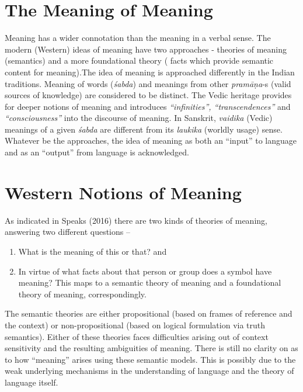 \section*{The Meaning of Meaning}

Meaning has a wider connotation than the meaning in a verbal sense. The modern (Western) ideas of meaning have two approaches - theories of meaning (semantics) and a more foundational theory ( facts which provide semantic content for meaning).The idea of meaning is approached differently in the Indian traditions. Meaning of words (\textit{śabda}) and meanings from other \textit{pramāṇa}-s (valid sources of knowledge) are considered to be distinct. The Vedic heritage provides for deeper notions of meaning and introduces \textit{“infinities”, “transcendences”} and \textit{“consciousness”} into the discourse of meaning. In Sanskrit, \textit{vaidika} (Vedic) meanings of a given \textit{śabda} are different from its \textit{laukika} (worldly usage) sense. Whatever be the approaches, the idea of meaning as both an “input” to language and as an “output” from language is acknowledged.

\newpage


\section*{Western Notions of Meaning}

\vskip -5pt

As indicated in Speaks (2016) there are two kinds of theories of meaning, answering two different questions –

\begin{enumerate}
\itemsep=0pt
\item What is the meaning of this or that? and

 \item In virtue of what facts about that person or group does a symbol have meaning? This maps to a semantic theory of meaning and a foundational theory of meaning, correspondingly.

\end{enumerate}

The semantic theories are either propositional (based on frames of reference and the context) or non-propositional (based on logical formulation via truth semantics). Either of these theories faces difficulties arising out of context sensitivity and the resulting ambiguities of meaning. There is still no clarity on as to how “meaning” arises using these semantic models. This is possibly due to the weak underlying mechanisms in the understanding of language and the theory of language itself.

